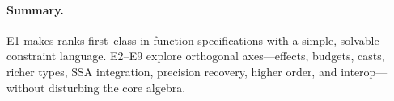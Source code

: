 \paragraph{Summary.}
\textsc{E1} makes ranks first–class in function specifications with a simple, solvable constraint language.
\textsc{E2}–\textsc{E9} explore orthogonal axes—effects, budgets, casts, richer types, SSA integration, precision recovery, higher order, and interop—without disturbing the core algebra.
